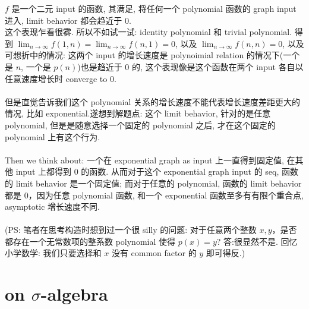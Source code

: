 \documentclass[lang=cn,11pt]{elegantbook}
\begin{document}
\begin{remark}
    $f$ 是一个二元 input 的函数, 其满足, 将任何一个 polynomial 函数的 graph input 进入, limit behavior 都会趋近于 0.\\ 这个表现乍看很雾. 所以不如试一试: identity polynomial 和 trivial polynomial. 得到 $\lim_{n \rightarrow \infty} f(1,n) = \lim_{n \rightarrow \infty} f(n,1) = 0$, 以及 $\lim_{n \rightarrow \infty} f(n,n) = 0$, 以及可想折中的情况: 这两个 input 的增长速度是 polynoimial relation 的情况下(一个是 $n$, 一个是 $p(n)$)也是趋近于 0 的, 这个表现像是这个函数在两个 input 各自以任意速度增长时 converge to 0.\\\\
    但是直觉告诉我们这个 polynomial 关系的增长速度不能代表增长速度差距更大的情况, 比如 exponential.遂想到解题点: 这个 limit behavior, 针对的是任意 polynomial, 但是是随意选择一个固定的 polynomial 之后, 才在这个固定的 polynomial 上有这个行为.\\\\
    Then we think about: 一个在 exponential graph as input 上一直得到固定值, 在其他 input 上都得到 0 的函数. 从而对于这个 exponential graph input 的 seq, 函数的 limit behavior 是一个固定值; 而对于任意的 polynomial, 函数的 limit behavior 都是 0，因为任意 polynomial 函数, 和一个 exponential 函数至多有有限个重合点, asymptotic 增长速度不同.\\\\
    (PS: 笔者在思考构造时想到过一个很 silly 的问题: 对于任意两个整数 $x,y$，是否都存在一个无常数项的整系数 polynomial 使得 $p(x) = y$? 答:很显然不是. 回忆小学数学: 我们只要选择和 $x$ 没有 common factor 的 $y$ 即可得反.)
\end{remark}





\chapter{on $\sigma$-algebra}
\end{document}
